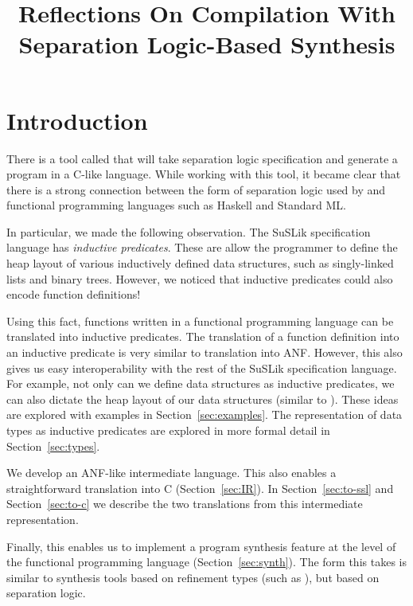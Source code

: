 \documentclass[runningheads]{llncs}
\begin{document}
\title{Reflections On Compilation With Separation Logic-Based Synthesis}
\maketitle

\section{Introduction}
\label{sec:introduction}

There is a tool called \SuSLik{} that will take separation logic specification and generate
a program in a C-like language. While working with this tool, it became clear that there is a strong
connection between the form of separation logic used by \SuSLik{} and functional programming languages such as Haskell and Standard ML.

In particular, we made the following observation. The SuSLik specification language has \textit{inductive predicates}. These are
allow the programmer to define the heap layout of various inductively defined data structures, such as singly-linked lists and binary trees.
However, we noticed that inductive predicates could also encode function definitions!

Using this fact, functions written in a functional programming language can be translated into inductive predicates. The translation
of a function definition into an inductive predicate is very similar to translation into ANF. However, this also gives us easy
interoperability with the rest of the SuSLik specification language. For example, not only can we define data structures as inductive
predicates, we can also dictate the heap layout of our data structures (similar to \Dargent\cite{Dargent}). These ideas are explored
with examples in Section~\ref{sec:examples}. The representation of data types as inductive predicates are explored in more formal detail
in Section~\ref{sec:types}.

We develop an ANF-like intermediate language. This also enables a straightforward translation into C (Section~\ref{sec:IR}).
In Section~\ref{sec:to-ssl} and Section~\ref{sec:to-c} we describe the two translations from this intermediate representation.

Finally, this enables us to implement a program synthesis feature at the level of the functional programming language (Section~\ref{sec:synth}).
The form this takes is similar to synthesis tools based on refinement types (such as \Synquid), but based on separation logic.
\end{document}
